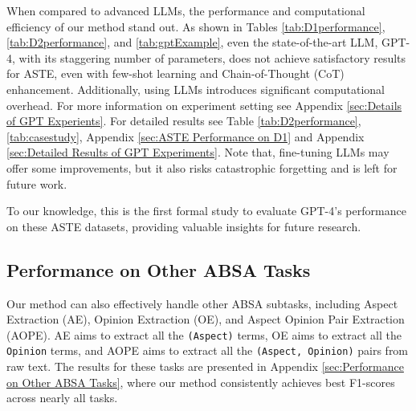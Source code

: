\documentclass[11pt]{article}
\begin{document}
When compared to advanced LLMs, the performance and computational efficiency of our method stand out. As shown in Tables \ref{tab:D1performance}, \ref{tab:D2performance}, and \ref{tab:gptExample}, even the state-of-the-art LLM, GPT-4, with its staggering number of parameters, does not achieve satisfactory results for ASTE, even with few-shot learning and Chain-of-Thought (CoT) \cite{wei2022chain} enhancement. Additionally, using LLMs introduces significant computational overhead. 
For more information on experiment setting see Appendix \ref{sec:Details of GPT Experients}. For detailed results see Table \ref{tab:D2performance}, \ref{tab:casestudy}, Appendix \ref{sec:ASTE Performance on D1} and Appendix \ref{sec:Detailed Results of GPT Experiments}.
Note that, fine-tuning LLMs may offer some improvements, but it also risks catastrophic forgetting \cite{shi2024continual} and is left for future work. 

To our knowledge, this is the first formal study to evaluate GPT-4's performance on these ASTE datasets, providing valuable insights for future research.

\subsection{Performance on Other ABSA Tasks}
Our method can also effectively handle other ABSA subtasks, including Aspect Extraction (AE), Opinion Extraction (OE), and Aspect Opinion Pair Extraction (AOPE).
AE aims to extract all the \texttt{(Aspect)} terms, OE aims to extract all the \texttt{Opinion} terms, and AOPE aims to extract all the \texttt{(Aspect, Opinion)} pairs from raw text. 
The results for these tasks are presented in Appendix \ref{sec:Performance on Other ABSA Tasks}, where our method consistently achieves best F1-scores across nearly all tasks.
\end{document}
